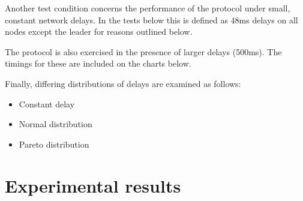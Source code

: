 \documentclass[11pt]{article} %
\theoremstyle{plain}
\theoremstyle{definition}
\begin{document}
Another test condition concerns the performance of the protocol under small,
constant network delays. In the tests below this is defined as 48ms delays on
all nodes except the leader for reasons outlined below.

The protocol is also exercised in the presence of larger delays (500ms). The
timings for these are included on the charts below.

Finally, differing distributions of delays are examined as follows:

\begin{itemize}
  \item Constant delay
  \item Normal distribution
  \item Pareto distribution
\end{itemize}

\section{Experimental results}














\end{document}
